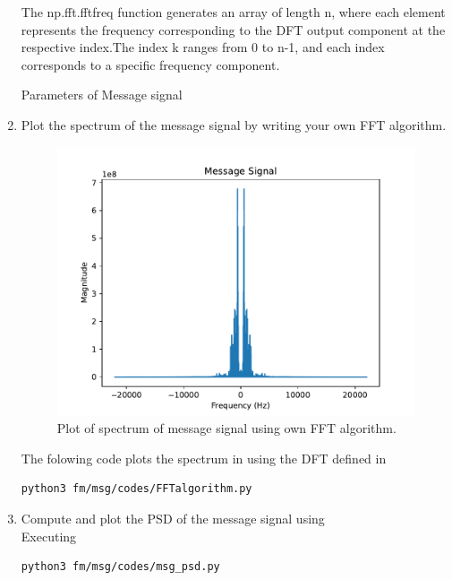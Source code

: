 \begin{enumerate}[label=\arabic*.,ref=\thesection.\theenumi]
The np.fft.fftfreq function generates an array of length n, where each element represents the frequency corresponding to the DFT output component at the respective index.The index k ranges from 0 to n-1, and each index corresponds to a specific frequency component.\\
\begin{table}
  \centering
  
  \caption{Parameters of Message signal}
  \label{4.1}
\end{table}
\item Plot the spectrum of the message signal by writing your own FFT algorithm.\\
	\solution
\begin{figure}[H]
\centering
\includegraphics[width=\columnwidth]{fm/msg/figs/FFTalgorithm.pdf}
\caption{Plot of spectrum of message signal using own FFT algorithm.}
\label{fig:FFTo}
\end{figure}
The folowing code plots the spectrum in  using the DFT defined in %
\begin{lstlisting}
python3 fm/msg/codes/FFTalgorithm.py
\end{lstlisting}
\item Compute and plot the PSD of the message signal using 
\\
	\solution
Executing	
\begin{lstlisting}
python3 fm/msg/codes/msg_psd.py
\end{lstlisting}


\end{enumerate}
